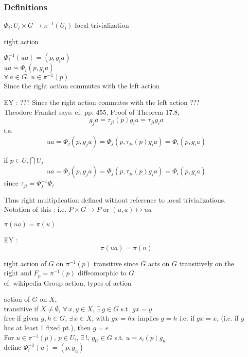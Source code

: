 \documentclass[twoside]{amsart}
\begin{document}
\subsubsection{ Definitions }

$\Phi_i: U_i \times G \to \pi^{-1}(U_i)$ local trivialization

right action

$\Phi_i^{-1}(ua) = (p,g_i a) $ \\
$ua = \Phi_i(p,g_i a)$ \\
$\forall \, a \in G, \, u \in \pi^{-1}(p)$ \\

Since the right action commutes with the left action  

EY : ??? Since the right action commutes with the left action   ??? \\
Theodore Frankel says: cf. pp. 455, Proof of Theorem 17.8, 
\[
g_ja = \tau_{ji}(p)g_i a = \tau_{ji} g_i a 
\]
i.e.
\[
ua = \Phi_j(p, g_ja) = \Phi_j(p,\tau_{ji}(p)g_ia ) = \Phi_i(p, g_ia)
\]



if $p \in U_i \bigcap U_j$
\[
ua = \Phi_j(p,g_j a) = \Phi_j(p, \tau_{ji}(p) g_i a) = \Phi_i(p,g_i a)
\]
since $\tau_{ji} = \Phi_j^{-1} \Phi_i$

Thus right multiplication defined without reference to local trivializations.  Notation of this : i.e. $P\times G \to P$ or $(u,a) \mapsto ua$




$\pi(ua) = \pi(u)$

EY : 
\[
\boxed{ \pi(ua) = \pi(u) }
\]

right action of $G$ on $\pi^{-1}(p)$ transitive since $G$ acts on $G$ transitively on the right and $F_p = \pi^{-1}(p)$ diffeomorphic to $G$ \\

cf. wikipedia Group action, types of action

action of $G$ on $X$, \\
transitive if $X \neq \emptyset $, $\forall \, x , y \in X, \, \exists \, g \in G$ s.t. $gx = y$ \\
free if given $g,h\in G$, $\exists \, x \in X$, with $gx  = hx$ implies $g=h$ i.e. if $gx = x$, (i.e. if $g$ has at least 1 fixed pt.), then $g=e$ \\

For $u \in \pi^{-1}(p)$, $p \in U_i$, $\exists \, !, \, g_U \in G$ s.t. $u = s_i(p)g_u$ \\
define $\Phi_i^{-1}(u) = (p, g_u)$   \\
\end{document}
